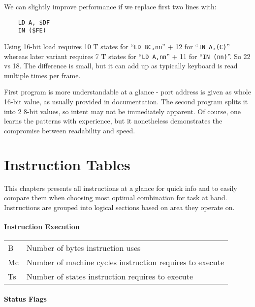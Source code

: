 \documentclass[twoside,openright,a4paper]{book}
\newcommand{\notet}{\rule{0pt}{2.4ex}}
\begin{document}
We can slightly improve performance if we replace first two lines with:

\begin{Verbatim}
	LD A, $DF
	IN ($FE)
\end{Verbatim}

Using 16-bit load requires 10 T states for ``{\tt LD BC,nn}'' + 12 for ``{\tt IN A,(C)}'' whereas later variant requires 7 T states for ``{\tt LD A,nn}'' + 11 for ``{\tt IN (nn)}''. So 22 vs 18. The difference is small, but it can add up as typically keyboard is read multiple times per frame.

First program is more understandable at a glance - port address is given as whole 16-bit value, as usually provided in documentation. The second program splits it into 2 8-bit values, so intent may not be immediately apparent. Of course, one learns the patterns with experience, but it nonetheless demonstrates the compromise between readability and speed.


\chapter{Instruction Tables}

This chapters presents all instructions at a glance for quick info and to easily compare them when choosing most optimal combination for task at hand. Instructions are grouped into logical sections based on area they operate on.

\minitoc

\pagebreak

\newcommand{\FS}{$\updownarrow$}
\newcommand{\FN}{$\bullet$}

\subsubsection{Instruction Execution}

\begin{tabular}{ll}
	B & 
		Number of bytes instruction uses \\
	Mc\notet & 
		Number of machine cycles instruction requires to execute \\
	Ts\notet & 
		Number of states instruction requires to execute \\
\end{tabular}

\subsubsection{Status Flags}
\end{document}
